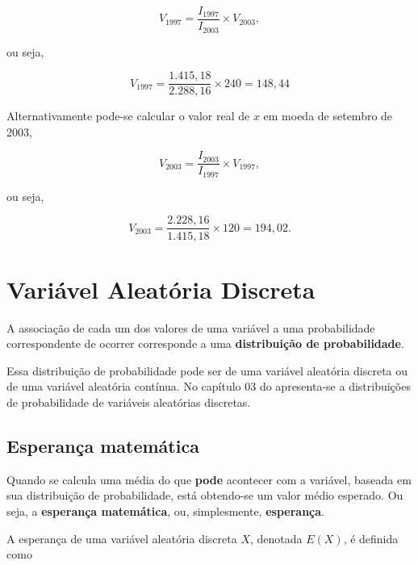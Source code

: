 \documentclass[
]{book}
\begin{document}
\begin{equation}
  V_{1997} = \frac{I_{1997}}{I_{2003}} \times V_{2003},
\end{equation}

ou seja,

\begin{equation}
  V_{1997} = \frac{1.415,18}{2.288,16} \times 240 = 148,44
\end{equation}

Alternativamente pode-se calcular o valor real de \(x\) em moeda de setembro de 2003,

\begin{equation}
  V_{2003} = \frac{I_{2003}}{I_{1997}} \times V_{1997},
\end{equation}

ou seja,

\begin{equation}
  V_{2003} = \frac{2.228,16}{1.415,18} \times 120 = 194,02.
\end{equation}

\hypertarget{variuxe1vel-aleatuxf3ria-discreta}{%
\chapter{Variável Aleatória Discreta}\label{variuxe1vel-aleatuxf3ria-discreta}}

A associação de cada um dos valores de uma variável a uma probabilidade
correspondente de ocorrer corresponde a uma \textbf{distribuição de
probabilidade}.

Essa distribuição de probabilidade pode ser de uma variável aleatória discreta
ou de uma variável aleatória contínua. No capítulo 03 do \citet{Sartoris2013} apresenta-se
a distribuições de probabilidade de variáveis aleatórias discretas.

\hypertarget{esperanuxe7a-matemuxe1tica}{%
\section{Esperança matemática}\label{esperanuxe7a-matemuxe1tica}}

Quando se calcula uma média do que \textbf{pode} acontecer com a variável,
baseada em sua distribuição de probabilidade, está obtendo-se um valor médio esperado.
Ou seja, a \textbf{esperança matemática}, ou, simplesmente, \textbf{esperança}.

A esperança de uma variável aleatória discreta \(X\), denotada \(E(X)\), é definida como
\end{document}
